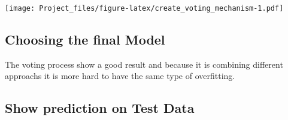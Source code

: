 \documentclass[]{article}
\newenvironment{Shaded}{\begin{snugshade}}{\end{snugshade}}
\newcommand{\KeywordTok}[1]{\textcolor[rgb]{0.13,0.29,0.53}{\textbf{#1}}}
\newcommand{\DataTypeTok}[1]{\textcolor[rgb]{0.13,0.29,0.53}{#1}}
\newcommand{\StringTok}[1]{\textcolor[rgb]{0.31,0.60,0.02}{#1}}
\newcommand{\OperatorTok}[1]{\textcolor[rgb]{0.81,0.36,0.00}{\textbf{#1}}}
\newcommand{\NormalTok}[1]{#1}
\begin{document}
\endgroup{}

\texttt{[image: Project\_files/figure-latex/create\_voting\_mechanism-1.pdf]}

\subsection{Choosing the final Model}\label{choosing-the-final-model}

The voting process show a good result and because it is combining
different approachs it is more hard to have the same type of
overfitting.

\subsection{Show prediction on Test
Data}\label{show-prediction-on-test-data}

\begin{Shaded}
\end{Shaded}
\end{document}
